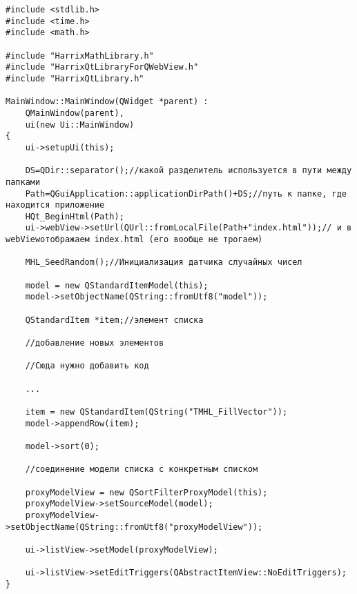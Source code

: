 \documentclass[a4paper,12pt]{article}
\begin{document}
\begin{itemize}
\begin{lstlisting}[label=examplefunction03, caption=mainwindow.cpp]
#include <stdlib.h>
#include <time.h>
#include <math.h>

#include "HarrixMathLibrary.h"
#include "HarrixQtLibraryForQWebView.h"
#include "HarrixQtLibrary.h"

MainWindow::MainWindow(QWidget *parent) :
    QMainWindow(parent),
    ui(new Ui::MainWindow)
{
    ui->setupUi(this);

    DS=QDir::separator();//какой разделитель используется в пути между папками
    Path=QGuiApplication::applicationDirPath()+DS;//путь к папке, где находится приложение
    HQt_BeginHtml(Path);
    ui->webView->setUrl(QUrl::fromLocalFile(Path+"index.html"));// и в webViewотображаем index.html (его вообще не трогаем)

    MHL_SeedRandom();//Инициализация датчика случайных чисел

    model = new QStandardItemModel(this);
    model->setObjectName(QString::fromUtf8("model"));

    QStandardItem *item;//элемент списка

    //добавление новых элементов
    
    //Сюда нужно добавить код
	
	...
    
    item = new QStandardItem(QString("TMHL_FillVector"));
    model->appendRow(item);

    model->sort(0);

    //соединение модели списка с конкретным списком

    proxyModelView = new QSortFilterProxyModel(this);
    proxyModelView->setSourceModel(model);
    proxyModelView->setObjectName(QString::fromUtf8("proxyModelView"));

    ui->listView->setModel(proxyModelView);

    ui->listView->setEditTriggers(QAbstractItemView::NoEditTriggers);
}
\end{lstlisting}


\end{itemize}
\end{document}
